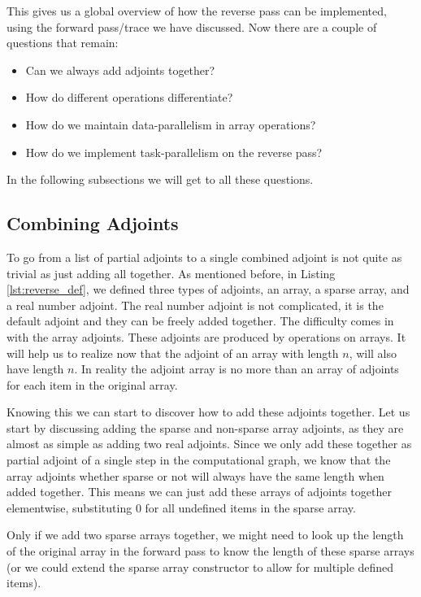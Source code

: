         This gives us a global overview of how the reverse pass can be implemented, using the forward pass/trace we have discussed.
        Now there are a couple of questions that remain:
        \begin{itemize}
            \item Can we always add adjoints together?
            \item How do different operations differentiate?
            \item How do we maintain data-parallelism in array operations?
            \item How do we implement task-parallelism on the reverse pass? 
        \end{itemize}
        In the following subsections we will get to all these questions.

    \subsection{Combining Adjoints}
        To go from a list of partial adjoints to a single combined adjoint is not quite as trivial as just adding all together.
        As mentioned before, in Listing \ref{lst:reverse_def}, we defined three types of adjoints, an array, a sparse array, and a real number adjoint.
        The real number adjoint is not complicated, it is the default adjoint and they can be freely added together.
        The difficulty comes in with the array adjoints.
        These adjoints are produced by operations on arrays.
        It will help us to realize now that the adjoint of an array with length $n$, will also have length $n$.
        In reality the adjoint array is no more than an array of adjoints for each item in the original array.

        Knowing this we can start to discover how to add these adjoints together.
        Let us start by discussing adding the sparse and non-sparse array adjoints, as they are almost as simple as adding two real adjoints.
        Since we only add these together as partial adjoint of a single step in the computational graph, we know that the array adjoints whether sparse or not will always have the same length when added together.
        This means we can just add these arrays of adjoints together elementwise, substituting $0$ for all undefined items in the sparse array.

        Only if we add two sparse arrays together, we might need to look up the length of the original array in the forward pass to know the length of these sparse arrays (or we could extend the sparse array constructor to allow for multiple defined items).

